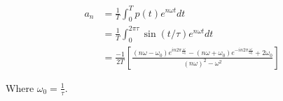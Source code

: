 \documentclass{article}
\begin{document}
\begin{equation}
\begin{split}
    a_n &= \frac{1}{T}\int_{0}^{T} p(t)e^{n\omega t}dt \\
    &= \frac{1}{T}\int_{0}^{2\pi\tau} \sin(t/\tau)e^{n\omega t}dt \\
    &= \frac{-1}{2T} \left[ \frac{(n\omega - \omega_0)e^{in2\pi \frac{\omega}{\omega_0}} - (n\omega + \omega_0)e^{-in2\pi \frac{\omega}{\omega_0}} + 2\omega_0}{(n\omega)^2 - \omega^2} \right]
\end{split}
\end{equation}

Where $\omega_0 = \frac{1}{\tau}$.
\end{document}
